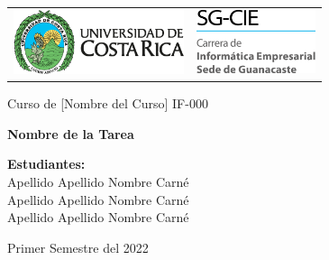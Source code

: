 \documentclass[12pt,a4paper]{article}
\begin{document}
\begin{titlepage}
    
    {\small
        \begin{tabular}{p{} p{} }
        \includegraphics[width=5cm]{images/logo-ucr.png} &
        \includegraphics[width=3.5cm]{images/CIE guanacaste vertical.png}
    \end{tabular}}
    
	\begin{center}
	    \vspace{2cm}

		\large{Curso de [Nombre del Curso] IF-000}\\
		
		\vspace{0,5\baselineskip}

		\Huge{\textbf{Nombre de la Tarea}\\}
		
        \vspace*{1\baselineskip}
		
		\large{\textbf{Estudiantes:} \\Apellido Apellido Nombre Carné\\Apellido Apellido Nombre Carné\\Apellido Apellido Nombre Carné}\\
	
	
		\vspace{3.5\baselineskip}
		
	
		\large{Primer Semestre del 2022}\\

	\end{center}
	
\end{titlepage}

\newpage
\tableofcontents
\listoffigures
\listoftables
\newpage
\newpage

\newpage
\nocite{*}

\end{document}
